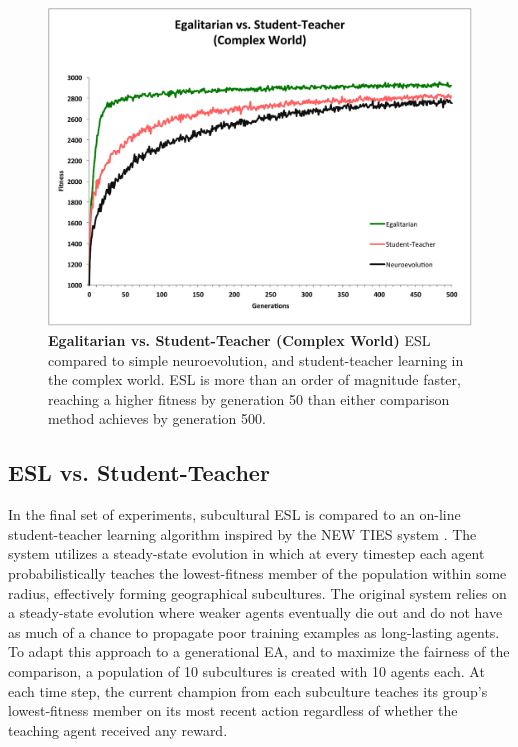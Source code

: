 \documentclass{sig-alternate}
\begin{document}
\begin{figure}[t]
  \centering
    \includegraphics[scale=.41]{egalitarian_vs_student_teacher_complex.pdf}
  \caption{\textbf{Egalitarian vs. Student-Teacher (Complex World)} ESL compared to simple neuroevolution, and student-teacher learning in the complex world.  ESL is more than an order of magnitude faster, reaching a higher fitness by generation 50 than either comparison method achieves by generation 500.}
  \label{fig:reward-studentteacher-complex}
\end{figure}

\subsection{ESL vs. Student-Teacher}
In the final set of experiments, subcultural ESL is compared to an on-line student-teacher learning algorithm inspired by the NEW TIES system \cite{haasdijk2008social}. The system utilizes a steady-state evolution in which at every timestep each agent probabilistically teaches the lowest-fitness member of the population within some radius, effectively forming geographical subcultures. The original system relies on a steady-state evolution where weaker agents eventually die out and do not have as much of a chance to propagate poor training examples as long-lasting agents. To adapt this approach to a generational EA, and to maximize the fairness of the comparison, a population of 10 subcultures is created with 10 agents each. At each time step, the current champion from each subculture teaches its group's lowest-fitness member on its most recent action regardless of whether the teaching agent received any reward.
\end{document}
